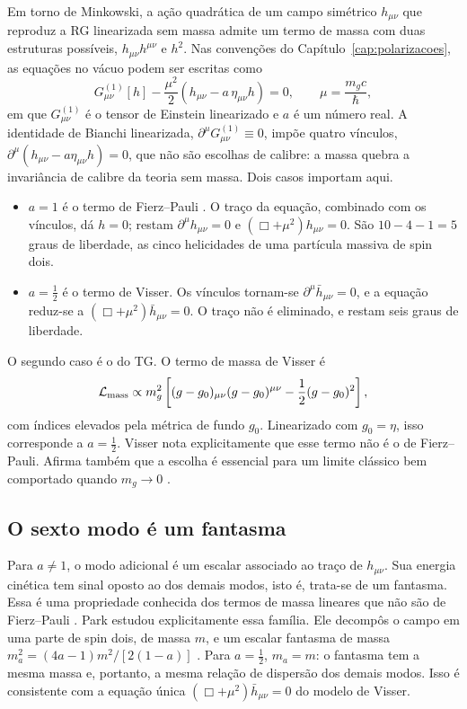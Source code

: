 Em torno de Minkowski, a ação quadrática de um campo simétrico
$h_{\mu\nu}$ que reproduz a RG linearizada sem massa admite um termo de
massa com duas estruturas possíveis, $h_{\mu\nu}h^{\mu\nu}$ e $h^2$.
Nas convenções do Capítulo~\ref{cap:polarizacoes}, as equações no vácuo
podem ser escritas como
\begin{equation}
 G^{(1)}_{\mu\nu}[h]-\frac{\mu^2}{2}
 \left(h_{\mu\nu}-a\,\eta_{\mu\nu}h\right)=0,
 \qquad \mu=\frac{m_gc}{\hbar},
 \label{eq:fund-familia}
\end{equation}
em que $G^{(1)}_{\mu\nu}$ é o tensor de Einstein linearizado e $a$ é um
número real. A identidade de Bianchi linearizada,
$\partial^\mu G^{(1)}_{\mu\nu}\equiv0$, impõe quatro vínculos,
$\partial^\mu(h_{\mu\nu}-a\eta_{\mu\nu}h)=0$, que não são escolhas de
calibre: a massa quebra a invariância de calibre da teoria sem massa.
Dois casos importam aqui.
\begin{itemize}
 \item $a=1$ é o termo de Fierz--Pauli \autocite{fierz1939}. O traço da
 equação, combinado com os vínculos, dá $h=0$; restam
 $\partial^\mu h_{\mu\nu}=0$ e $(\Box+\mu^2)h_{\mu\nu}=0$. São
 $10-4-1=5$ graus de liberdade, as cinco helicidades de uma partícula
 massiva de spin dois.
 \item $a=\frac12$ é o termo de Visser. Os vínculos tornam-se
 $\partial^\mu\bar h_{\mu\nu}=0$, e a equação reduz-se a
 $(\Box+\mu^2)\bar h_{\mu\nu}=0$. O traço não é eliminado, e restam
 seis graus de liberdade.
\end{itemize}
O segundo caso é o do TG. O termo de massa de Visser é
\autocite{visser1998}
\begin{equation}
 \mathcal L_{\rm mass}\propto m_g^2\left[
 (g-g_0)_{\mu\nu}(g-g_0)^{\mu\nu}-\frac12(g-g_0)^2\right],
 \label{eq:fund-visser}
\end{equation}
com índices elevados pela métrica de fundo $g_0$. Linearizado com
$g_0=\eta$, isso corresponde a $a=\frac12$. Visser nota explicitamente
que esse termo não é o de Fierz--Pauli. Afirma também que a escolha é
essencial para um limite clássico bem comportado quando $m_g\to0$
\autocite{visser1998}.

\subsection{O sexto modo é um fantasma}
\label{sec:fund-fantasma}

Para $a\neq1$, o modo adicional é um escalar associado ao traço de
$h_{\mu\nu}$. Sua energia cinética tem sinal oposto ao dos demais
modos, isto é, trata-se de um fantasma. Essa é uma propriedade conhecida
dos termos de massa lineares que não são de Fierz--Pauli
\autocite{hinterbichler2012}. Park estudou explicitamente essa família.
Ele decompôs o campo em uma parte de spin dois, de massa $m$, e um
escalar fantasma de massa $m_a^2=(4a-1)m^2/[2(1-a)]$ \autocite{park2010}.
Para $a=\frac12$, $m_a=m$: o fantasma tem a mesma massa e, portanto, a
mesma relação de dispersão dos demais modos. Isso é consistente com a
equação única $(\Box+\mu^2)\bar h_{\mu\nu}=0$ do modelo de Visser.

